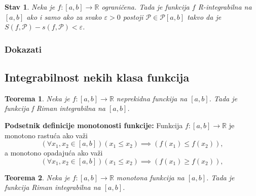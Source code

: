\documentclass{article}
\newtheorem{teorema}{Teorema}[section]
\newtheorem{stav}{Stav}[section]
\begin{document}
\begin{stavbox}
    \label{stav_2.3}
    \begin{stav}
        Neka je $f: \left[a,b\right]\longrightarrow\mathbb{R}$ ograničena. Tada je funkcija $f$
        R-integrabilna na $\left[a,b\right]$ ako i samo ako za svako $\varepsilon>0$ postoji
        $\mathcal{P}\in\mathcal{P}\left[a,b\right]$ takvo da je $S\left(f,\mathcal{P}\right)-s\left(f,\mathcal{P}\right)<\varepsilon$.
    \end{stav}
    \subsubsection{Dokazati}
\end{stavbox}

\subsection{Integrabilnost nekih klasa funkcija}
\begin{teoremabox}
    \label{teorema_2.3}
    \begin{teorema}
        Neka je $f: \left[a, b\right] \longrightarrow \mathbb{R}$ neprekidna funckija na $\left[a, b\right]$. Tada je funkcija f Riman integrabilna na $\left[a, b\right]$.
    \end{teorema}
\end{teoremabox}

\begin{defbox}
    \label{podsetnik_definicije_2}
    \textbf{Podsetnik definicije monotonosti funkcije:} Funkcija $f:\left[a,b\right]\longrightarrow\mathbb{R}$
    je monotono rastuća ako važi
    $$\left(\forall x_1,x_2\in\left[a,b\right]\right)\left(x_1\leq x_2\right)\implies \left(f\left(x_1\right)\leq f\left(x_2\right)\right),$$
    a monotono opadajuća ako važi
    $$\left(\forall x_1,x_2\in\left[a,b\right]\right)\left(x_1\leq x_2\right)\implies \left(f\left(x_1\right)\geq f\left(x_2\right)\right),$$
\end{defbox}

\begin{teoremabox}
    \label{teorema_2.4}
    \begin{teorema}
        Neka je $f: \left[a, b\right] \longrightarrow \mathbb{R}$ monotona funkcija na $\left[a, b\right]$. Tada je funkcija Riman integrabilna na $\left[a, b\right]$.
    \end{teorema}
\end{teoremabox}
\end{document}
